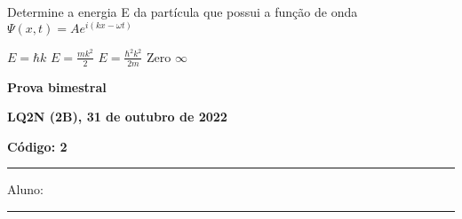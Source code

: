 \documentclass[12pt, addpoints]{exam}
\begin{document}
        \begin{questions}
\begin{multicols*}{2}
\question[20] Determine a energia E da partícula que possui a função de onda $\Psi(x,t)=Ae^{i(kx-\omega t)}$

\begin{choices}
\choice $E=\hbar k$ \choice $E = \frac{mk^2}{2}$ \choice $E=\frac{\hbar^2k^2}{2m}$ \choice Zero \choice $\infty$ \end{choices}
\end{multicols*}
\end{questions}
\newpage
        \begin{minipage}[b]{0.75\linewidth}
            \begin{flushleft}
                {\bf \large Prova bimestral}
            \end{flushleft}
            \begin{flushleft}
                {\bf \large LQ2N (2B), 31 de outubro de 2022}
            \end{flushleft}
        \end{minipage}
        \begin{minipage}[b]{0.20\linewidth}
            \begin{flushright}
                {\bf \large Código: 2}
            \end{flushright}
        \end{minipage}
        \vspace{0.5cm} \hrule \vspace{0.5cm}
        \begin{minipage}{0.75\linewidth}
            Aluno:
        \end{minipage}
        \vspace{0.5cm} \hrule \vspace{0.5cm}
\end{document}
